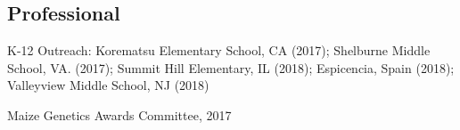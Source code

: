 \documentclass[letterpaper,10pt]{article}
\renewenvironment{itemize}{
  \begin{list}{}{
    \setlength{\leftmargin}{1.5em}
  }
}{
  \end{list}
}
\begin{document}
\begin{itemize}
\subsection*{Professional}
\item K-12 Outreach: Korematsu Elementary School, CA (2017); Shelburne Middle School, VA. (2017); Summit Hill Elementary, IL (2018); Espicencia, Spain (2018); Valleyview Middle School, NJ (2018)
\item Maize Genetics Awards Committee, 2017

\end{itemize}
\end{document}
